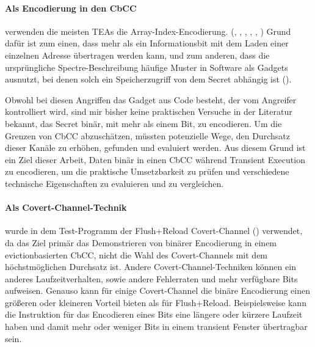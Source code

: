 \paragraph{Als Encodierung in den \acs{CbCC}}
verwenden die meisten \acp{TEA}
die Array-Index-En\-co\-die\-rung. (\cite{lipp_meltdown_2020},
\cite{van_schaik_ridl_2019}, \cite{schwarz_zombieload_2019},
\cite{hertogh_rain_nodate}, \cite{kim_slap_2025},
\cite{kim_flop_2025})
Grund dafür ist zum einen, dass
mehr als ein Informationsbit mit dem Laden einer einzelnen
Adresse übertragen werden kann, und zum anderen, dass die
ursprüngliche Spectre-Beschreibung häufige Muster in Software
als Gadgets ausnutzt, bei denen solch ein Speicherzugriff von
dem Secret abhängig ist (\cite[8]{kocher_spectre_2019}).

Obwohl bei diesen Angriffen das Gadget aus Code besteht, der vom
Angreifer kontrolliert wird, sind mir bisher keine praktischen
Versuche in der Literatur bekannt, das Secret binär, mit mehr als
einem Bit, zu encodieren. Um die Grenzen von \ac{CbCC}
abzuschätzen, müssten potenzielle Wege, den Durchsatz dieser
Kanäle zu erhöhen, gefunden und evaluiert werden. Aus diesem Grund
ist ein Ziel dieser Arbeit, Daten binär in einen \ac{CbCC} während
Transient Execution zu encodieren, um die praktische
Umsetzbarkeit zu prüfen und verschiedene technische
Eigenschaften zu evaluieren und zu vergleichen.

\paragraph{Als Covert-Channel-Technik}
wurde in dem Test-Programm der Flush+Reload Covert-Channel
(\cite{yarom_flushreload_2014}) verwendet,
da das Ziel primär das Demonstrieren von binärer Encodierung in
einem evictionbasierten \ac{CbCC}, nicht die Wahl des
Covert-Channels mit dem höchstmöglichen Durchsatz ist. Andere
Covert-Channel-Techniken können ein anderes Laufzeitverhalten,
sowie andere Fehlerraten und mehr verfügbare Bits aufweisen.
Genauso kann für einige Covert-Channel die binäre Encodierung
einen größeren oder kleineren Vorteil bieten als für
Flush+Reload. Beispielsweise kann die Instruktion für das
Encodieren eines Bits eine längere oder kürzere Laufzeit haben
und damit mehr oder weniger Bits in einem transient Fenster
übertragbar sein.

